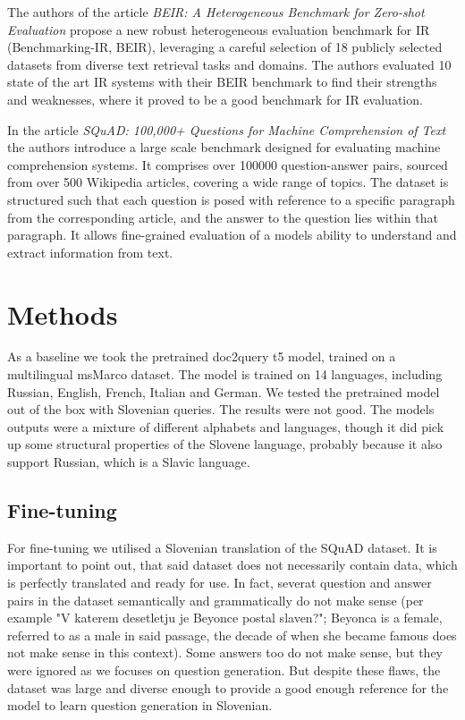 \documentclass[fleqn,moreauthors,10pt]{ds_report}
\begin{document}
The authors of the article \textit{BEIR: A Heterogeneous Benchmark for Zero-shot Evaluation}\cite{DBLP:journals/corr/abs-2104-08663} propose a new robust heterogeneous evaluation benchmark for IR (Benchmarking-IR, BEIR), leveraging a careful selection of 18 publicly selected datasets from diverse text retrieval tasks and domains. The authors evaluated 10 state of the art IR systems with their BEIR benchmark to find their strengths and weaknesses, where it proved to be a good benchmark for IR evaluation.

In the article \textit{SQuAD: 100,000+ Questions for Machine Comprehension of Text}\cite{DBLP:journals/corr/RajpurkarZLL16} the authors introduce a large scale benchmark designed for evaluating machine comprehension systems. It comprises over 100000 question-answer pairs, sourced from over 500 Wikipedia articles, covering a wide range of topics. The dataset is structured such that each question is posed with reference to a specific paragraph from the corresponding article, and the answer to the question lies within that paragraph. It allows fine-grained evaluation of a models ability to understand and extract information from text.




\section*{Methods}

As a baseline we took the pretrained doc2query t5 model, trained on a multilingual msMarco dataset\cite{msmarcomodel}. The model is trained on 14 languages, including Russian, English, French, Italian and German. We tested the pretrained model out of the box with Slovenian queries. The results were not good. The models outputs were a mixture of different alphabets and languages, though it did pick up some structural properties of the Slovene language, probably because it also support Russian, which is a Slavic language. 

\subsection{Fine-tuning}
For fine-tuning we utilised a Slovenian translation of the SQuAD dataset\cite{slosquad}. It is important to point out, that said dataset does not necessarily contain data, which is perfectly translated and ready for use. In fact, severat question and answer pairs in the dataset semantically and grammatically do not make sense (per example "V katerem desetletju je Beyonce postal slaven?"; Beyonca is a female, referred to as a male in said passage, the decade of when she became famous does not make sense in this context). Some answers too do not make sense, but they were ignored as we focuses on question generation. But despite these flaws, the dataset was large and diverse enough to provide a good enough reference for the model to learn question generation in Slovenian.
\end{document}
